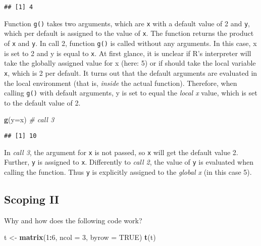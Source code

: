 \documentclass[12,]{article}
\newenvironment{Shaded}{\begin{snugshade}}{\end{snugshade}}
\newcommand{\KeywordTok}[1]{\textcolor[rgb]{0.13,0.29,0.53}{\textbf{#1}}}
\newcommand{\DataTypeTok}[1]{\textcolor[rgb]{0.13,0.29,0.53}{#1}}
\newcommand{\DecValTok}[1]{\textcolor[rgb]{0.00,0.00,0.81}{#1}}
\newcommand{\StringTok}[1]{\textcolor[rgb]{0.31,0.60,0.02}{#1}}
\newcommand{\CommentTok}[1]{\textcolor[rgb]{0.56,0.35,0.01}{\textit{#1}}}
\newcommand{\OtherTok}[1]{\textcolor[rgb]{0.56,0.35,0.01}{#1}}
\newcommand{\OperatorTok}[1]{\textcolor[rgb]{0.81,0.36,0.00}{\textbf{#1}}}
\newcommand{\NormalTok}[1]{#1}
\begin{document}
\begin{verbatim}
## [1] 4
\end{verbatim}

Function \texttt{g()} takes two arguments, which are \texttt{x} with a
default value of 2 and \texttt{y}, which per default is assigned to the
value of \texttt{x}. The function returns the product of \texttt{x} and
\texttt{y}. In call 2, function \texttt{g()} is called without any
arguments. In this case, x is set to 2 and y is equal to \texttt{x}. At
first glance, it is unclear if R's interpreter will take the globally
assigned value for x (here: 5) or if should take the local variable
\texttt{x}, which is 2 per default. It turns out that the default
arguments are evaluated in the local environment (that is, \emph{inside}
the actual function). Therefore, when calling \texttt{g()} with default
arguments, y is set to equal the \emph{local x} value, which is set to
the default value of 2.

\begin{Shaded}
\begin{Highlighting}[]
\KeywordTok{g}\NormalTok{(}\DataTypeTok{y=}\NormalTok{x)  }\CommentTok{# call 3}
\end{Highlighting}
\end{Shaded}

\begin{verbatim}
## [1] 10
\end{verbatim}

In \emph{call 3}, the argument for \texttt{x} is not passed, so
\texttt{x} will get the default value 2. Further, \texttt{y} is assigned
to \texttt{x}. Differently to \emph{call 2}, the value of \texttt{y} is
evaluated when calling the function. Thus \texttt{y} is explicitly
assigned to the \emph{global x} (in this case 5).

\pagebreak

\subsection*{Scoping II}\label{scoping-ii}

Why and how does the following code work?

\begin{Shaded}
\begin{Highlighting}[]
\NormalTok{t <-}\StringTok{ }\KeywordTok{matrix}\NormalTok{(}\DecValTok{1}\OperatorTok{:}\DecValTok{6}\NormalTok{, }\DataTypeTok{ncol =} \DecValTok{3}\NormalTok{, }\DataTypeTok{byrow =} \OtherTok{TRUE}\NormalTok{) }
\KeywordTok{t}\NormalTok{(t)}
\end{Highlighting}
\end{Shaded}
\end{document}
